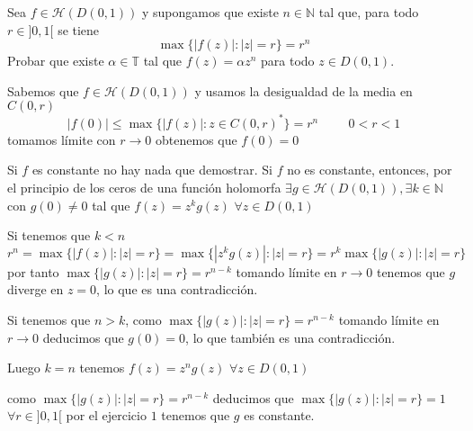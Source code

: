 \begin{ejer}
	Sea $f\in\mathcal{H}(D(0,1))$ y supongamos que existe $n\in\mathbb{N}$ tal que, para todo $r\in ]0,1[$ se tiene
	$$ \max \{ |f(z)| : |z|=r \} = r^n $$
	Probar que existe $\alpha\in\mathbb{T}$ tal que $f(z)=\alpha z^n$ para todo $z\in D(0,1)$.
\end{ejer}
\begin{sol}
Sabemos que $f\in\mathcal{H}(D(0,1))$ y usamos la desigualdad de la media en $C(0,r)$ 
$$|f(0)| \leq \max\{ |f(z)| : z\in C(0,r)^{\ast} \} = r^n \hspace{1cm} 0<r<1$$
tomamos límite con $r\rightarrow 0$ obtenemos que $f(0)=0$

Si $f$ es constante no hay nada que demostrar.
Si $f$ no es constante, entonces, por el principio de los ceros de una función holomorfa $\exists g\in\mathcal{H}(D(0,1)), \exists k\in\mathbb{N}$ con $g(0) \not=0$ tal que $f(z) = z^kg(z)$ $\forall z\in D(0,1)$

Si tenemos que $k<n$
$$r^n = \max\{ |f(z)| : |z|=r \} = \max\{ |z^kg(z)| : |z|=r \} = r^k \max\{ |g(z)| : |z|=r \}$$
por tanto
$\max\{ |g(z)| : |z|=r \} = r^{n-k}$ tomando límite en $r\rightarrow0$ tenemos que $g$ diverge en $z=0$, lo que es una contradicción.

Si tenemos que $n>k$,
como $\max\{ |g(z)| : |z|=r \} = r^{n-k}$ tomando límite en $r\rightarrow 0$ deducimos que $g(0)=0$, lo que también es una contradicción.

Luego $k=n$ tenemos $f(z)=z^ng(z)$ $\forall z\in D(0,1)$

como $\max\{ |g(z)| : |z|=r \} = r^{n-k}$ deducimos que $\max\{ |g(z)| : |z|=r \} = 1$ $\forall r\in]0,1[$
por el ejercicio $1$ tenemos que $g$ es constante.



\begin{comment}
	ENUNCIADO
	Si $f\in\mathbb{H}(\mathbb{C})$ y es inyectiva, ¿Qué se puede decir de $f$?
	
	SOLUCIÓN
	Como $f$ es entera tenemos que $f(z) = \sum_{n=0}^{\infty} \frac{f^{(n)}(0)}{n!}z^n \forall z\in\mathbb{C}$
	
	Si $f$ es un polinomio de grado $k$
	si $k\geq 2$ el teorema fundamental del álgebra nos dice que $f$ tiene al menos $2$ ceros (contando multiplicidad), los ceros no pueden ser distintos porque $f$ es inyectiva, por tanto $f$ tiene un cero de orden al menos $2$.
	

\end{comment}
\end{sol}
